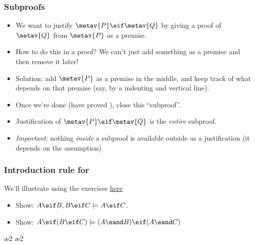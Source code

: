 \begin{frame}
  \frametitle{Subproofs}

  \begin{itemize}[<+->]
    \item We want to justify $\metav{P} \eif \metav{Q}$ by giving a
    proof of $\metav{Q}$ from $\metav{P}$ as a premise.
    \item How to do this in a proof? We can't just add something as a
    premise and then remove it later!
    \item Solution: add $\metav{P}$ as a premise in the middle, and keep track
    of what depends on that premise (say, by a indenting and vertical
    line).
    \item Once we're done (have proved ), close this ``subproof''.
    \item Justification of $\metav{P} \eif \metav{Q}$ is the \emph{entire} subproof.
    \item \emph{Important}: nothing \emph{inside} a subproof is available
    outside as a justification (it depends on the assumption)
  \end{itemize}
\end{frame}

\begin{frame}
  \frametitle{Introduction rule for \eif}
  \begin{fitchproof}
    \open
    \ellipsesline
    \close
     
  \end{fitchproof}
  We'll illustrate using the exercises
  \href{https://carnap.io/shared/rzach@ucalgary.ca/Practice\%20Problems\%20IV.md}{here}
  \begin{itemize}
  \item Show: $A \eif B, B \eif C \models A \eif C$.
  \item Show: $A \eif (B \eif C) \models (A \eand B) \eif (A \eand C)$
  \end{itemize}
\end{frame}

\begin{frame}
  \begin{fitchproof}
    \open
    \close
  \end{fitchproof}
\end{frame}

\begin{frame}
  \begin{fitchproof}
    \open
    \ae{2}
    \ae{2}
    \close
  \end{fitchproof}
\end{frame}

